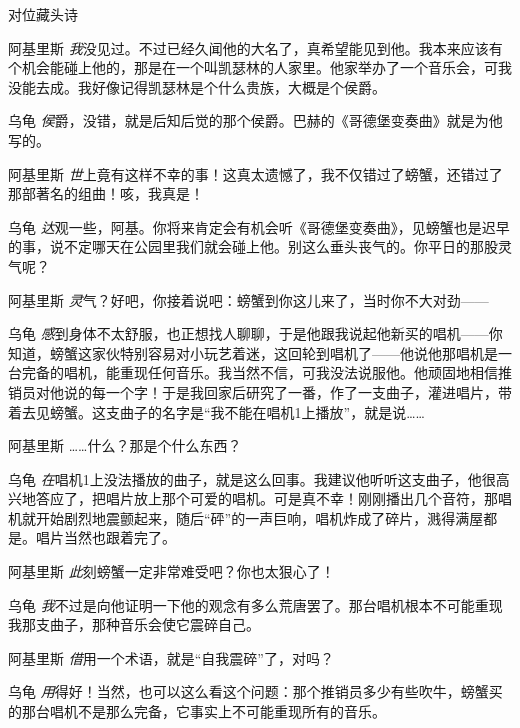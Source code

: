 \begin{dialog}{对位藏头诗}
\begin{dialogue}
\item[阿基里斯]\emph{我}没见过。不过已经久闻他的大名了，真希望能见到他。我本来应该有个机会能碰上他的，那是在一个叫凯瑟林的人家里。他家举办了一个音乐会，可我没能去成。我好像记得凯瑟林是个什么贵族，大概是个侯爵。

\item[乌龟]\emph{侯}爵，没错，就是后知后觉的那个侯爵。巴赫的《哥德堡变奏曲》就是为他写的。

\item[阿基里斯]\emph{世}上竟有这样不幸的事！这真太遗憾了，我不仅错过了螃蟹，还错过了那部著名的组曲！咳，我真是！

\item[乌龟]\emph{达}观一些，阿基。你将来肯定会有机会听《哥德堡变奏曲》，见螃蟹也是迟早的事，说不定哪天在公园里我们就会碰上他。别这么垂头丧气的。你平日的那股灵气呢？

\item[阿基里斯]\emph{灵}气？好吧，你接着说吧：螃蟹到你这儿来了，当时你不大对劲——

\item[乌龟]\emph{感}到身体不太舒服，也正想找人聊聊，于是他跟我说起他新买的唱机——你知道，螃蟹这家伙特别容易对小玩艺着迷，这回轮到唱机了——他说他那唱机是一台完备的唱机，能重现任何音乐。我当然不信，可我没法说服他。他顽固地相信推销员对他说的每一个字！于是我回家后研究了一番，作了一支曲子，灌进唱片，带着去见螃蟹。这支曲子的名字是“我不能在唱机1上播放”，就是说……

\item[阿基里斯]……什么？那是个什么东西？

\item[乌龟]\emph{在}唱机1上没法播放的曲子，就是这么回事。我建议他听听这支曲子，他很高兴地答应了，把唱片放上那个可爱的唱机。可是真不幸！刚刚播出几个音符，那唱机就开始剧烈地震颤起来，随后“砰”的一声巨响，唱机炸成了碎片，溅得满屋都是。唱片当然也跟着完了。

\item[阿基里斯]\emph{此}刻螃蟹一定非常难受吧？你也太狠心了！

\item[乌龟]\emph{我}不过是向他证明一下他的观念有多么荒唐罢了。那台唱机根本不可能重现我那支曲子，那种音乐会使它震碎自己。

\item[阿基里斯]\emph{借}用一个术语，就是“自我震碎”了，对吗？

\item[乌龟]\emph{用}得好！当然，也可以这么看这个问题：那个推销员多少有些吹牛，螃蟹买的那台唱机不是那么完备，它事实上不可能重现所有的音乐。


\end{dialogue}
\end{dialog}
